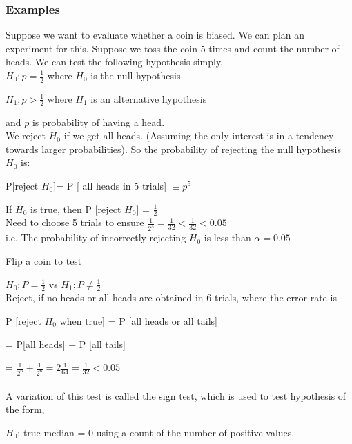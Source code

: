 \documentclass[12pt,a4paper]{article}
\theoremstyle{regla}
\theoremstyle{remark}
\theoremstyle{definition}
\theoremstyle{nonumberbreak}
\begin{document}
\subsubsection{Examples}
\begin{xmpl}
Suppose we want to evaluate whether a coin is biased. We can plan an experiment for this. Suppose we toss the coin 5 times and count the number of heads. We can test the following hypothesis simply.\\


$H_0: p = \frac {1} {2}$ where $H_0$ is the null hypothesis

$H_1 ; p > \frac {1} {2}$ where $H_1$ is an alternative hypothesis

and $p$ is probability of having a head.\\

We reject $H_0$ if we get all heads. (Assuming the only interest is in a tendency towards larger probabilities). So the probability of rejecting the null hypothesis $H_0$ is:

P[reject $H_0$]= P [ all  heads in 5 trials] $\equiv p^5$

If $H_0$ is true, then P [reject $H_0$] = $\frac {1} {2}$\\

Need to choose 5 trials to ensure $\frac {1} {2^5} = \frac {1} {32} < \frac {1} {32} < 0.05 $\\

i.e. The probability of incorrectly rejecting $H_0$ is less than $\alpha = 0.05$
\end{xmpl}
\begin{xmpl}

Flip a coin to test 

$ H_0: P = \frac {1} {2}$  vs
$H_1: P \neq \frac {1} {2}$\\

Reject, if no heads or all heads are obtained in 6 trials, where the error rate is

P [reject $H_0$ when true] = P [all heads or all tails]
												
 = P[all heads] + P [all tails]
												
 = $\frac {1} {2^6} + \frac {1} {2^6} = 2 \frac {1} {64} = \frac {1} {32} < 0.05$\\\\


A variation of this test is called the sign test, which is used to test hypothesis of the form,

$ H_0$: true median = 0 using a count of the number of positive values.
\end{xmpl}
\end{document}
